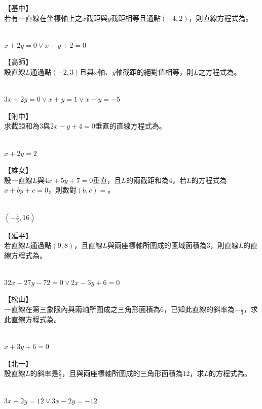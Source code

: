 \documentclass
[answers]
{exam}
\newcommand\ul[1]{\uline{\hspace*{#1}}}
\theoremstyle{definition}
\begin{document}
\begin{questions}
\question
【基中】\\
若有一直線在坐標軸上之$x$截距與$y$截距相等且通點$\left( -4,2\right)$，則直線方程式為\ul{50pt}。
\begin{solution}~\\
	$x+2y=0 \vee x+y+2=0$
\end{solution}

\question
【高師】\\
設直線$L$通過點$\left( -2,3\right)$且與$x$軸、$y$軸截距的絕對值相等，則$L$之方程式為\ul{50pt}。
\begin{solution}~\\
	$3x+2y=0 \vee x+y = 1 \vee x - y = -5$
\end{solution}

\question
【附中】\\
求截距和為$3$與$2x-y+4=0$垂直的直線方程式為\ul{50pt}。
\begin{solution}~\\
	$x+2y = 2$
\end{solution}

\question
【雄女】\\
設一直線$L$與$4x+5y+7=0$垂直，且$L$的兩截距和為$4$，若$L$的方程式為$x+by+c=0$，則數對$\left( b,c\right)=$\ul{50pt}。
\begin{solution}~\\
	$\left( -\frac{4}{5},16\right)$
\end{solution}

\question
【延平】\\
若直線$L$通過點$\left( 9,8\right)$，且直線$L$與兩座標軸所圍成的區域面積為$3$，則直線$L$的直線方程式為\ul{50pt}。
\begin{solution}~\\
	$32x-27y-72=0 \vee 2x-3y+6=0 $
\end{solution}

\question
【松山】\\
一直線在第三象限內與兩軸所圍成之三角形面積為$6$，已知此直線的斜率為$-\frac{1}{3}$，求此直線方程式為\ul{50pt}。
\begin{solution}~\\
	$x+3y+6=0$
\end{solution}

\question
【北一】\\
設直線$L$的斜率是$\frac{3}{2}$，且與兩座標軸所圍成的三角形面積為$12$，求$L$的方程式為\ul{50pt}。
\begin{solution}~\\
	$3x-2y=12 \vee 3x-2y = -12$
\end{solution}


\end{questions}
\end{document}
